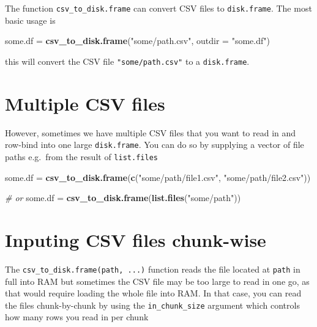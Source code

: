 \documentclass[]{book}
\newenvironment{Shaded}{\begin{snugshade}}{\end{snugshade}}
\newcommand{\CommentTok}[1]{\textcolor[rgb]{0.56,0.35,0.01}{\textit{#1}}}
\newcommand{\DataTypeTok}[1]{\textcolor[rgb]{0.13,0.29,0.53}{#1}}
\newcommand{\KeywordTok}[1]{\textcolor[rgb]{0.13,0.29,0.53}{\textbf{#1}}}
\newcommand{\NormalTok}[1]{#1}
\newcommand{\StringTok}[1]{\textcolor[rgb]{0.31,0.60,0.02}{#1}}
\begin{document}
The function \texttt{csv\_to\_disk.frame} can convert CSV files to \texttt{disk.frame}. The most basic usage is

\begin{Shaded}
\begin{Highlighting}[]
\NormalTok{some.df =}\StringTok{ }\KeywordTok{csv_to_disk.frame}\NormalTok{(}\StringTok{"some/path.csv"}\NormalTok{, }\DataTypeTok{outdir =} \StringTok{"some.df"}\NormalTok{)}
\end{Highlighting}
\end{Shaded}

this will convert the CSV file \texttt{"some/path.csv"} to a \texttt{disk.frame}.

\hypertarget{multiple-csv-files}{%
\section{Multiple CSV files}\label{multiple-csv-files}}

However, sometimes we have multiple CSV files that you want to read in and row-bind into one large \texttt{disk.frame}. You can do so by supplying a vector of file paths e.g.~from the result of \texttt{list.files}

\begin{Shaded}
\begin{Highlighting}[]
\NormalTok{some.df =}\StringTok{ }\KeywordTok{csv_to_disk.frame}\NormalTok{(}\KeywordTok{c}\NormalTok{(}\StringTok{"some/path/file1.csv"}\NormalTok{, }\StringTok{"some/path/file2.csv"}\NormalTok{))}

\CommentTok{# or}
\NormalTok{some.df =}\StringTok{ }\KeywordTok{csv_to_disk.frame}\NormalTok{(}\KeywordTok{list.files}\NormalTok{(}\StringTok{"some/path"}\NormalTok{))}
\end{Highlighting}
\end{Shaded}

\hypertarget{inputing-csv-files-chunk-wise}{%
\section{Inputing CSV files chunk-wise}\label{inputing-csv-files-chunk-wise}}

The \texttt{csv\_to\_disk.frame(path,\ ...)} function reads the file located at \texttt{path} in full into RAM but sometimes the CSV file may be too large to read in one go, as that would require loading the whole file into RAM. In that case, you can read the files chunk-by-chunk by using the \texttt{in\_chunk\_size} argument which controls how many rows you read in per chunk
\end{document}
